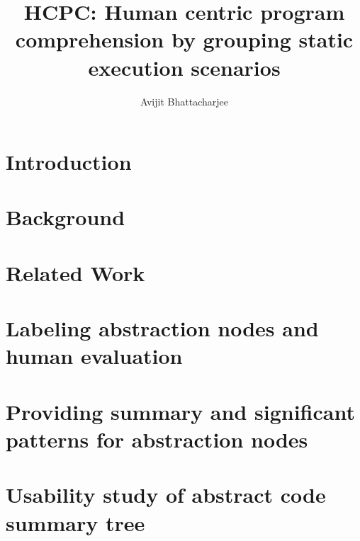 \documentclass{uofsthesis-cs}
\title{HCPC: Human centric program comprehension by grouping static execution scenarios}
\author{Avijit Bhattacharjee}
\begin{document}
\maketitle

\frontmatter


\chapter{Introduction}




%
% 
% 
%


\chapter{Background}


\chapter{Related Work}


\chapter{ Labeling abstraction nodes and human evaluation}


\chapter{ Providing summary and significant patterns for abstraction nodes}


\chapter{Usability study of abstract code summary tree}

\end{document}
